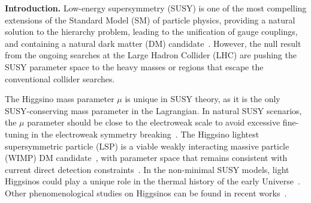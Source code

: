 \documentclass[
    twocolumn,
    superscriptaddress,
    amsmath, 
    amssymb,
    aps,
    reprint,
    floatfix
]{revtex4-2}
\newcommand{\Wei}[1]{\textcolor{green2} {Wei: #1}}
\begin{document}

\noindent
\textbf{Introduction.}
Low-energy supersymmetry (SUSY) is one of the most compelling extensions of the Standard Model (SM) of particle physics, providing a natural solution to the hierarchy problem, leading to the unification of gauge couplings, and containing a natural dark matter (DM) candidate~\cite{Dreiner:2023yus, Martin:1997ns, Wang:2023suf, Haber:1984rc, Bae:2014yta}. However, the null result from the ongoing searches at the Large Hadron Collider (LHC) are pushing the SUSY parameter space to  the heavy masses or regions that escape the conventional collider searches.

The Higgsino mass parameter $\mu$ is unique in SUSY theory, as it is the only SUSY-conserving mass parameter in the Lagrangian.
In natural SUSY scenarios, the $\mu$ parameter should be close to the electroweak scale to avoid excessive fine-tuning in the electroweak symmetry breaking~\cite{Feng:2013pwa, vanBeekveld:2019tqp, Barbieri:1987fn, Arvanitaki:2013yja, Evans:2013jna, Baer:2014ica}. The Higgsino lightest supersymmetric particle (LSP) is a viable weakly interacting massive particle (WIMP) DM candidate~\cite{Delgado:2020url,Baer:2025srs}, with parameter space that remains consistent with current direct detection constraints~\cite{Martin:2024ytt, Martin:2024pxx}.   In the non-minimal SUSY models, light Higgsinos could play a unique role in the thermal history of the early Universe~\cite{Cao:2018rix, Cao:2019qng, Cao:2019evo, Cao:2021lmj, Cao:2021tuh, Yue:2025dqe, Liang:2025utb, Dong:2024juh, Wang:2024ozr, Chakraborti:2024pdn, Dai:2023pli, Khan:2025yit}. Other phenomenological studies on Higgsinos can be found in recent works~\cite{Araz:2025bww, Zhou:2025xol, Carpenter:2023agq, Baer:2025zqt, Baer:2024hqm, Nagata:2025ycf, Baer:2024tfo, Fowlie:2024nhs, Li:2023hey, VanBeekveld:2021tgn, Baer:2020sgm, Bae:2019dgg, Baer:2017pba, Wang:2016otm, Fan:2024jvz, Du:2023qvj, Wang:2023bmh, Li:2022zap, Wang:2022rfd, Wang:2018idz, Khan:2025azf, Yin:2024bwv, Fu:2023sfk, Agin:2024yfs, Rodd:2024qsi, Liu:2020muv, Liu:2020ctf, Zhao:2022pnv}. 
\end{document}
